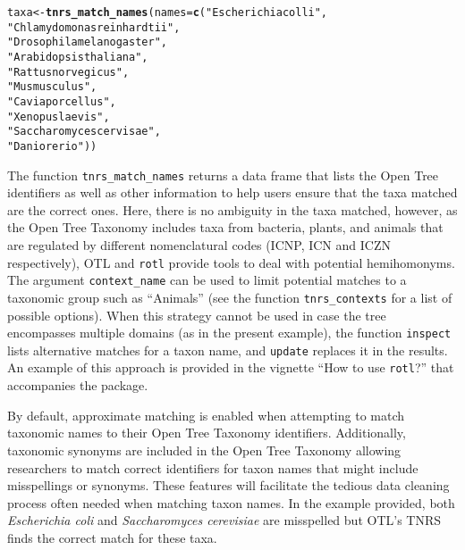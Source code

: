 \documentclass[12pt,letterpaper]{article}\usepackage[]{graphicx}\usepackage[]{color}
\makeatletter
\newcommand{\hlstr}[1]{\textcolor[rgb]{0.192,0.494,0.8}{#1}}%
\newcommand{\hlstd}[1]{\textcolor[rgb]{0.345,0.345,0.345}{#1}}%
\newcommand{\hlkwb}[1]{\textcolor[rgb]{0.69,0.353,0.396}{#1}}%
\newcommand{\hlkwc}[1]{\textcolor[rgb]{0.333,0.667,0.333}{#1}}%
\newcommand{\hlkwd}[1]{\textcolor[rgb]{0.737,0.353,0.396}{\textbf{#1}}}%
\newenvironment{kframe}{%
 \def\at@end@of@kframe{}%
 \ifinner\ifhmode%
  \def\at@end@of@kframe{\end{minipage}}%
  \begin{minipage}{\columnwidth}%
 \fi\fi%
 \def\FrameCommand##1{\hskip\@totalleftmargin \hskip-\fboxsep
 \colorbox{shadecolor}{##1}\hskip-\fboxsep
     \hskip-\linewidth \hskip-\@totalleftmargin \hskip\columnwidth}%
 \MakeFramed {\advance\hsize-\width
   \@totalleftmargin\z@ \linewidth\hsize
   \@setminipage}}%
 {\par\unskip\endMakeFramed%
 \at@end@of@kframe}
\newenvironment{knitrout}{}{} %
\makeatother
\begin{document}
\begin{knitrout}
\color{fgcolor}\begin{kframe}
\begin{alltt}
\hlstd{taxa} \hlkwb{<-} \hlkwd{tnrs_match_names}\hlstd{(}\hlkwc{names} \hlstd{=} \hlkwd{c}\hlstd{(}\hlstr{"Escherichia colli"}\hlstd{,}
                                   \hlstr{"Chlamydomonas reinhardtii"}\hlstd{,}
                                   \hlstr{"Drosophila melanogaster"}\hlstd{,}
                                   \hlstr{"Arabidopsis thaliana"}\hlstd{,}
                                   \hlstr{"Rattus norvegicus"}\hlstd{,}
                                   \hlstr{"Mus musculus"}\hlstd{,}
                                   \hlstr{"Cavia porcellus"}\hlstd{,}
                                   \hlstr{"Xenopus laevis"}\hlstd{,}
                                   \hlstr{"Saccharomyces cervisae"}\hlstd{,}
                                   \hlstr{"Danio rerio"}\hlstd{))}
\end{alltt}
\end{kframe}
\end{knitrout}

The function \texttt{tnrs\_match\_names} returns a data frame that lists the
Open Tree identifiers as well as other information to help users ensure that the
taxa matched are the correct ones. Here, there is no ambiguity in the taxa
matched, however, as the Open Tree Taxonomy includes taxa from bacteria, plants,
and animals that are regulated by different nomenclatural codes (ICNP, ICN and
ICZN respectively), OTL and \texttt{rotl} provide tools to deal with potential
hemihomonyms. The argument \texttt{context\_name} can be used to limit potential
matches to a taxonomic group such as ``Animals'' (see the function
\texttt{tnrs\_contexts} for a list of possible options).  When this strategy
cannot be used in case the tree encompasses multiple domains (as in the present
example), the function \texttt{inspect} lists alternative matches for a taxon
name, and \texttt{update} replaces it in the results. An example of this
approach is provided in the vignette ``How to use \texttt{rotl}?'' that
accompanies the package.

By default, approximate matching is enabled when attempting to match taxonomic
names to their Open Tree Taxonomy identifiers. Additionally, taxonomic synonyms
are included in the Open Tree Taxonomy allowing researchers to match correct
identifiers for taxon names that might include misspellings or synonyms. These
features will facilitate the tedious data cleaning process often needed when
matching taxon names. In the example provided, both \textit{Escherichia coli}
and \textit{Saccharomyces cerevisiae} are misspelled but OTL's TNRS finds the
correct match for these taxa.
\end{document}
